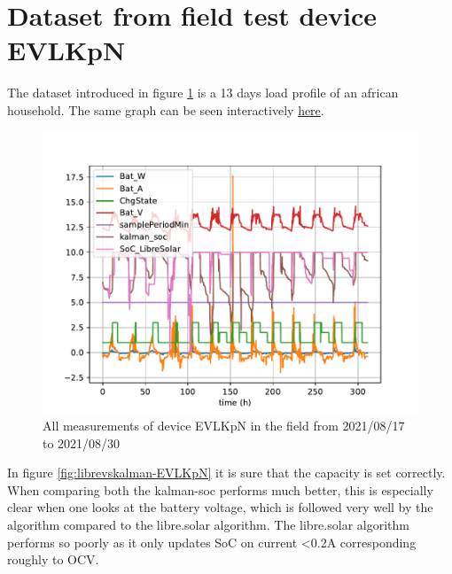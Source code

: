 \pagebreak 

\section{Dataset from field test device EVLKpN} 

The dataset introduced in figure \ref{fig:librevskalman-EVLKpN-all} is a 13 days load profile of an african household. The same graph can be seen interactively \href{https://raw.githack.com/mulles/kalman-soc/main/data/EVLKpN_20210817-20210830_SOC_Graph.html}
{here}.  

\begin{figure}[h!]
\centering	
\includegraphics[width=16cm]{EVLKpN_20210817-20210830-librevskalman-all.pdf}
\caption{\label{fig:librevskalman-EVLKpN-all}  All measurements of device EVLKpN in the field from 2021/08/17 to 2021/08/30 }
\end{figure}

\pagebreak

In figure \ref{fig:librevskalman-EVLKpN} it is sure that the capacity is set correctly. When comparing both the kalman-soc performs much better, this is especially clear when one looks at the battery voltage, which is followed very well by the algorithm compared to the libre.solar algorithm. The libre.solar algorithm performs so poorly as it only updates SoC on current <0.2A corresponding roughly to OCV. 



